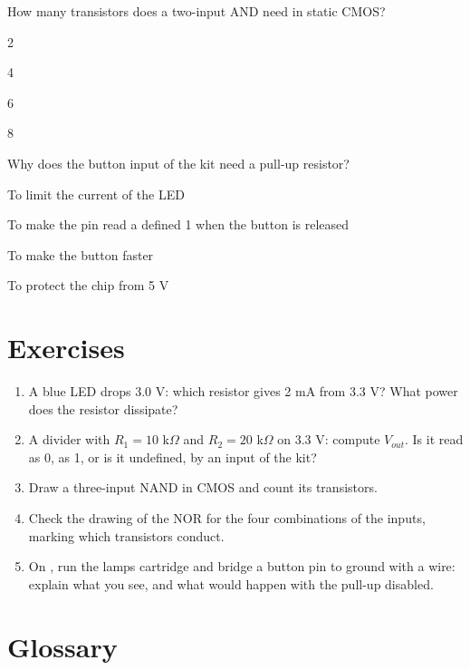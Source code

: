 \begin{quiz}{How many transistors does a two-input AND need in static CMOS?}
\item 2
\item 4
\item 6
\item 8
\end{quiz}

\begin{quiz}{Why does the button input of the kit need a pull-up resistor?}
\item To limit the current of the LED
\item To make the pin read a defined 1 when the button is released
\item To make the button faster
\item To protect the chip from 5 V
\end{quiz}

\section{Exercises}

\begin{exercise}
\begin{enumerate}[nosep]
\item A blue LED drops 3.0 V: which resistor gives 2 mA from 3.3 V? What power
  does the resistor dissipate?
\item A divider with $R_1=10$ k$\Omega$ and $R_2=20$ k$\Omega$ on 3.3 V:
  compute $V_{out}$. Is it read as 0, as 1, or is it undefined, by an input
  of the kit?
\item Draw a three-input NAND in CMOS and count its transistors.
\item Check the drawing of the NOR for the four combinations of the inputs,
  marking which transistors conduct.
\item On \prg, run the lamps cartridge and bridge a button pin to ground with a
  wire: explain what you see, and what would happen with the pull-up disabled.
\end{enumerate}
\end{exercise}

\section{Glossary}

